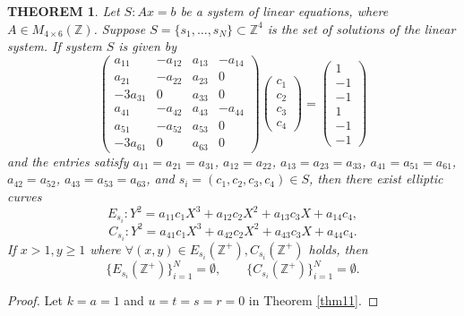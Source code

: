 \documentclass[11pt]{amsart}
\newtheorem{theorem}{THEOREM}
\begin{document}
\begin{theorem}\label{thm12}
Let $S: Ax=b$ be a system of linear equations, where $A\in M_{4\times6}(\mathbb{Z})$. Suppose $S=\{s_1,\dots,s_N\}\subset\mathbb{Z}^4$ is the set of solutions of the linear system. If system $S$ is given by
\[
\begin{pmatrix}
a_{11}&-a_{12}&a_{13}&-a_{14}\\
a_{21}&-a_{22}&a_{23}&0\\
-3a_{31}&0&a_{33}&0\\
a_{41}&-a_{42}&a_{43}&-a_{44}\\
a_{51}&-a_{52}&a_{53}&0\\
-3a_{61}&0&a_{63}&0
\end{pmatrix}
\begin{pmatrix}c_1\\c_2\\c_3\\c_4\end{pmatrix}
=\begin{pmatrix}1\\-1\\-1\\1\\-1\\-1\end{pmatrix}
\]
and the entries satisfy $a_{11}=a_{21}=a_{31}$, $a_{12}=a_{22}$, $a_{13}=a_{23}=a_{33}$, $a_{41}=a_{51}=a_{61}$, $a_{42}=a_{52}$, $a_{43}=a_{53}=a_{63}$, and $s_i=(c_1,c_2,c_3,c_4)\in S$, then there exist elliptic curves
\[
E_{s_i}: Y^2=a_{11}c_1X^3+a_{12}c_2X^2+a_{13}c_3X+a_{14}c_4,
\]
\[
C_{s_i}: Y^2=a_{41}c_1X^3+a_{42}c_2X^2+a_{43}c_3X+a_{44}c_4.
\]
If $x>1,y\ge1$ where $\forall(x,y)\in E_{s_i}(\mathbb{Z}^+),C_{s_i}(\mathbb{Z}^+)$ holds, then
\[
\{E_{s_i}(\mathbb{Z}^+)\}_{i=1}^N=\emptyset, \qquad \{C_{s_i}(\mathbb{Z}^+)\}_{i=1}^N=\emptyset.
\]
\end{theorem}
\begin{proof}
Let $k=a=1$ and $u=t=s=r=0$ in Theorem \ref{thm11}.
\end{proof}
\end{document}

